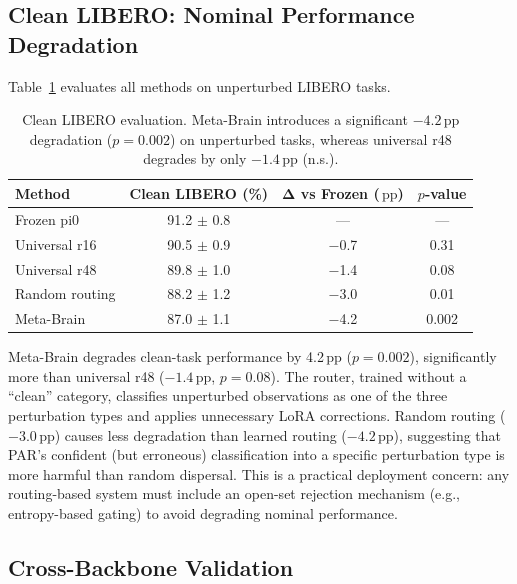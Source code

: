 \documentclass[letterpaper]{article}
\newcommand{\ours}{Meta-Brain}
\newcommand{\pp}{\,\text{pp}}
\begin{document}
\subsection{Clean LIBERO: Nominal Performance Degradation}
\label{sec:clean}

Table~\ref{tab:clean} evaluates all methods on unperturbed LIBERO tasks.

\begin{table}[h]
\centering
\caption{Clean LIBERO evaluation. \ours{} introduces a significant $-4.2\pp$ degradation ($p=0.002$) on unperturbed tasks, whereas universal r48 degrades by only $-1.4\pp$ (n.s.).}
\label{tab:clean}
\small
\begin{tabular}{lccc}
\toprule
\textbf{Method} & \textbf{Clean LIBERO (\%)} & $\boldsymbol{\Delta}$ \textbf{vs Frozen ($\pp$)} & \textbf{$p$-value} \\
\midrule
Frozen pi0 & 91.2 $\pm$ 0.8 & --- & --- \\
Universal r16 & 90.5 $\pm$ 0.9 & $-$0.7 & 0.31 \\
Universal r48 & 89.8 $\pm$ 1.0 & $-$1.4 & 0.08 \\
Random routing & 88.2 $\pm$ 1.2 & $-$3.0 & 0.01 \\
\ours{} & 87.0 $\pm$ 1.1 & $-$4.2 & 0.002 \\
\bottomrule
\end{tabular}
\end{table}

\ours{} degrades clean-task performance by 4.2$\pp$ ($p = 0.002$), significantly more than universal r48 ($-1.4\pp$, $p = 0.08$). The router, trained without a ``clean'' category, classifies unperturbed observations as one of the three perturbation types and applies unnecessary LoRA corrections. Random routing ($-3.0\pp$) causes less degradation than learned routing ($-4.2\pp$), suggesting that PAR's confident (but erroneous) classification into a specific perturbation type is more harmful than random dispersal. This is a practical deployment concern: any routing-based system must include an open-set rejection mechanism (e.g., entropy-based gating) to avoid degrading nominal performance.

\subsection{Cross-Backbone Validation}
\label{sec:cross_backbone}
\end{document}

